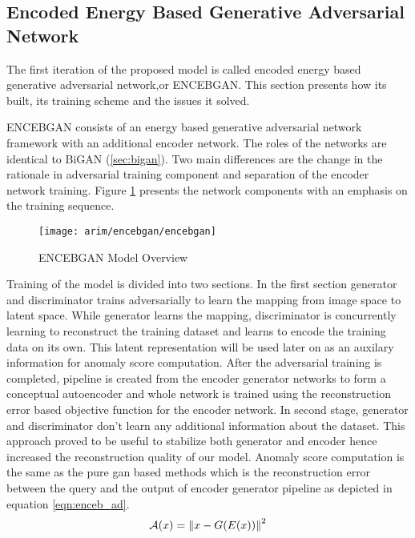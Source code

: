 \subsection{Encoded Energy Based Generative Adversarial Network}
\label{sec:encebgan}

The first iteration of the proposed model is called encoded energy based generative adversarial
network,or ENCEBGAN. This section presents how its built, its training scheme and the issues it
solved.

ENCEBGAN consists of an energy based generative adversarial network framework with an additional
encoder network. The roles of the networks are identical to BiGAN (\ref{sec:bigan}). Two main
differences are the change in the rationale in adversarial training component and separation of the
encoder network training. Figure \ref{fig:encebgan_model} presents the network components with an
emphasis on the training sequence.
\begin{figure}[h!]
	\centering
	\texttt{[image: arim/encebgan/encebgan]}
	\caption{ENCEBGAN Model Overview }
	\label{fig:encebgan_model}
\end{figure}

Training of the model is divided into two sections. In the first section generator and discriminator
trains adversarially to learn the mapping from image space to latent space. While generator learns
the mapping, discriminator is concurrently learning to reconstruct the training dataset and learns
to encode the training data on its own. This latent representation will be used later on as an
auxilary information for anomaly score computation. After the adversarial training is completed,
pipeline is created from the encoder generator networks to form a conceptual autoencoder and whole
network is trained using the reconstruction error based objective function for the encoder network.
In second stage, generator and discriminator don't learn any additional information about the
dataset. This approach proved to be useful to stabilize both generator and encoder hence increased
the reconstruction quality of our model. Anomaly score computation is the same as the pure gan based
methods which is the reconstruction error between the query and the output of encoder generator
pipeline as depicted in equation \ref{eqn:enceb_ad}. 
\begin{equation}
	\label{eqn:enceb_ad}
	\mathcal{A}(x) = \left\lVert x - G(E(x))\right\rVert^2
\end{equation}

